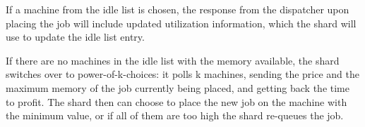 If a machine from the idle list is chosen, the response from the dispatcher upon
placing the job will include updated utilization information, which the shard
will use to update the idle list entry.

If there are no machines in the idle list with the memory available, the shard
switches over to power-of-k-choices: it polls k machines, sending the price and
the maximum memory of the job currently being placed, and getting back the time
to profit. The shard then can choose to place the new job on the machine with
the minimum value, or if all of them are too high the shard re-queues the job.
